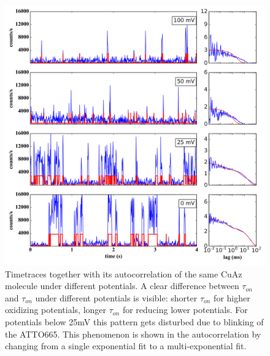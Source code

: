 \documentclass[twoside,single]{lion-msc}
\begin{document}
\begin{figure}[ht!]
\centering
\includegraphics[width=1\textwidth]{plots_timetraces_diff_pot}
\caption{Timetraces together with its autocorrelation of the same CuAz molecule under different potentials. A clear difference between $\tau_{on}$ and $\tau_{on}$ under different potentials is visible: shorter $\tau_{on}$ for higher oxidizing potentials, longer $\tau_{on}$ for reducing lower potentials. For potentials below 25mV this pattern gets disturbed due to blinking of the ATTO665. This phenomenon is shown in the autocorrelation by changing from a single exponential fit to a multi-exponential fit.}
\label{plots_timetraces_diff_pot}
\end{figure}
\end{document}
